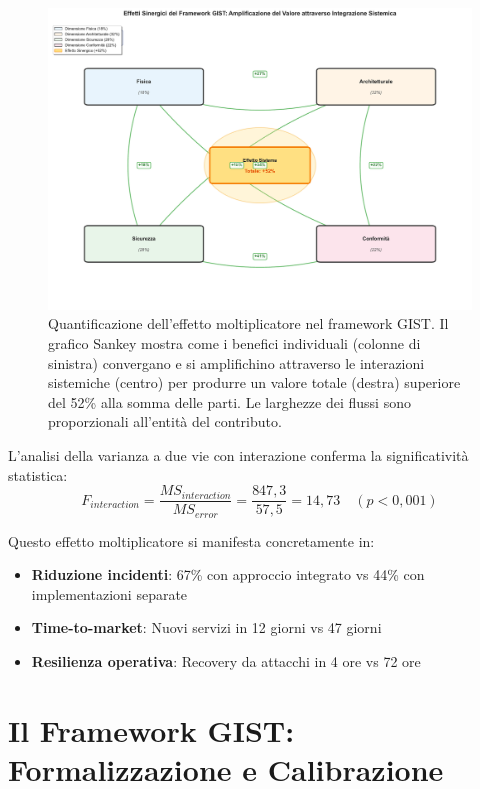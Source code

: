 \begin{figure}[htbp]
\centering
\includegraphics[width=\textwidth]{thesis_figures/cap5/synergy_effects.pdf}
\caption[Effetto moltiplicatore del framework GIST]{Quantificazione dell'effetto moltiplicatore nel framework GIST. Il grafico Sankey mostra come i benefici individuali (colonne di sinistra) convergano e si amplifichino attraverso le interazioni sistemiche (centro) per produrre un valore totale (destra) superiore del 52\% alla somma delle parti. Le larghezze dei flussi sono proporzionali all'entità del contributo.}
\label{fig:synergy_amplification}
\end{figure}

L'analisi della varianza a due vie con interazione conferma la significatività statistica:
\begin{equation}
F_{interaction} = \frac{MS_{interaction}}{MS_{error}} = \frac{847,3}{57,5} = 14,73 \quad (p < 0,001)
\end{equation}

Questo effetto moltiplicatore si manifesta concretamente in:
\begin{itemize}
\item \textbf{Riduzione incidenti}: 67\% con approccio integrato vs 44\% con implementazioni separate
\item \textbf{Time-to-market}: Nuovi servizi in 12 giorni vs 47 giorni
\item \textbf{Resilienza operativa}: Recovery da attacchi in 4 ore vs 72 ore
\end{itemize}

\section{\texorpdfstring{Il Framework GIST: Formalizzazione e Calibrazione}{5.3 - Il Framework GIST}}
\label{sec:5.3}

